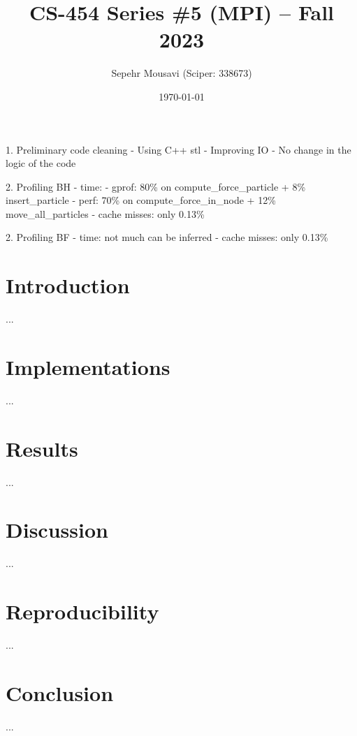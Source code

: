 \documentclass[10pt,journal,compsocconf]{IEEEtran}
\title{CS-454 Series \#5 (MPI) -- Fall 2023}
\author{
  Sepehr Mousavi (Sciper: 338673)
}
\date{\today}
\begin{document}
\maketitle


1. Preliminary code cleaning
  - Using C++ stl
  - Improving IO
  - No change in the logic of the code

2. Profiling BH
  - time:
    - gprof: 80\% on compute_force_particle + 8\% insert_particle
    - perf: 70\% on compute_force_in_node + 12\% move_all_particles
  - cache misses: only 0.13\%
    
2. Profiling BF
  - time: not much can be inferred
  - cache misses: only 0.13\%


\section{Introduction}
...

\section{Implementations}
...

\section{Results}
...

\section{Discussion}
...

\section{Reproducibility}
...

\section{Conclusion}
...
\end{document}
